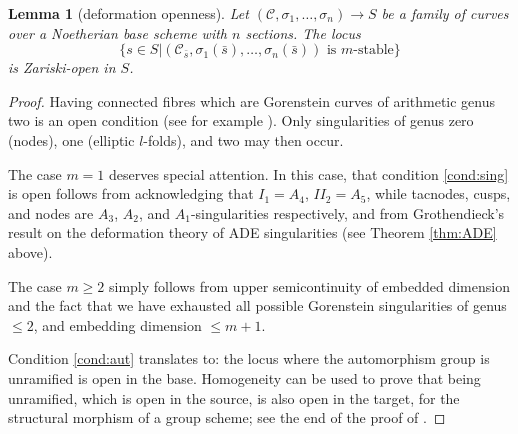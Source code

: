 \documentclass{compositio}
\renewcommand{\to}{\rightarrow}
\theoremstyle{plain}
\newtheorem{lem}[thm]{Lemma}
\theoremstyle{definition}
\theoremstyle{remark}
\begin{document}
\begin{lem}[deformation openness]
 Let $(\mathcal C,\sigma_1,\ldots,\sigma_n)\to S$ be a family of curves over a Noetherian base scheme with $n$ sections. The locus \[\{s\in S|(\mathcal C_{\bar s},\sigma_1(\bar s),\ldots,\sigma_n(\bar s)) \text{ is } m\text{-stable}\}\] is Zariski-open in $S$.
\end{lem}
\begin{proof}
 Having connected fibres which are Gorenstein curves of arithmetic genus two is an open condition (see for example \cite[\href{https://stacks.math.columbia.edu/tag/0E1M}{Tag 0E1M}]{stacks-project}). Only singularities of genus zero (nodes), one (elliptic $l$-folds), and two may then occur.
 
 The case $m=1$ deserves special attention. In this case, that condition \eqref{cond:sing} is open follows from acknowledging that $I_1=A_4$, $I\!I_2=A_5$, while tacnodes, cusps, and nodes are $A_3$, $A_2$, and $A_1$-singularities respectively, and from Grothendieck's result on the deformation theory of ADE singularities (see Theorem \ref{thm:ADE} above).
 
 The case $m\geq 2$ simply follows from upper semicontinuity of embedded dimension and the fact that we have exhausted all possible Gorenstein singularities of genus $\leq 2$, and embedding dimension $\leq m+1$.
 
 Condition \eqref{cond:aut} translates to: the locus where the automorphism group is unramified is open in the base. Homogeneity can be used to prove that being unramified, which is open in the source, is also open in the target, for the structural morphism of a group scheme; see the end of the proof of \cite[Lemma 3.10]{SMY1}.
 

\end{proof}
\end{document}
